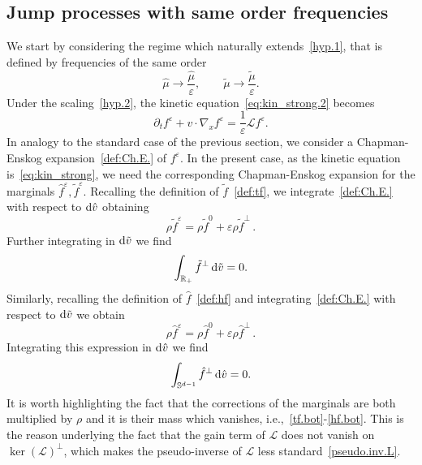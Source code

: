 \documentclass[a4paper]{article}
\theoremstyle{Theorem}\newtheorem{proposition}{Proposition}[section]
\theoremstyle{Remark}\newtheorem{remark}{Remark}[section]
\theoremstyle{Theorem}\newtheorem{theorem}{Theorem}[section]
\newcommand{\R}{\mathbb{R}}
\newcommand{\hv}{\hat{v}}
\newcommand{\tv}{\tilde{v}}
\newcommand{\hf}{\hat{f}}
\newcommand{\tf}{\tilde{f}}
\newcommand{\hmu}{\hat{\mu}}
\newcommand{\tmu}{\tilde{\mu}}
\newcommand{\intS}{\int_{\mathbb{S}^{d-1}}}
\newcommand{\intR}{\int_{\R_+}}
\newcommand{\intV}{\int_{\mathcal{V}}}
\begin{document}
\subsection{Jump processes with same order frequencies}
We start by considering the regime which naturally extends~\eqref{hyp.1}, that is defined by frequencies of the same order 
\begin{equation}\label{hyp.2}
    \hmu \rightarrow \dfrac{\hmu}{\varepsilon}, \qquad \tmu \rightarrow \dfrac{\tmu}{\varepsilon}.
\end{equation}
Under the scaling~\eqref{hyp.2}, the kinetic equation~\eqref{eq:kin_strong.2} becomes
\begin{equation}\label{kin_macro_hyp}
    \partial_t f^\varepsilon +v\cdot \nabla_x f^\varepsilon =\dfrac{1}{\varepsilon} \mathcal{L}f^\varepsilon.
\end{equation}
In analogy to the standard case of the previous section, we consider a Chapman-Enskog expansion~\eqref{def:Ch.E.} of $f^\varepsilon$. In the present case, as the kinetic equation is~\eqref{eq:kin_strong}, we need the corresponding Chapman-Enskog expansion for the marginals $\hf^\varepsilon,\tf^\varepsilon$.
Recalling the definition of $\tf$~\eqref{def:tf}, we integrate~\eqref{def:Ch.E.} with respect to ${\rm d} \hv$ obtaining
\begin{equation*}
    \rho \tf^\varepsilon = \rho \tf^0+\varepsilon \rho \tf^{\bot}\,.
\end{equation*}
Further integrating in ${\rm d} \tv$ we find 
\begin{equation}\label{tf.bot}
\intR \tf^{\bot} \, {\rm d} \tv =0 .
\end{equation}
Similarly, recalling the definition of $\hf$~\eqref{def:hf} and integrating~\eqref{def:Ch.E.} with respect to ${\rm d} \tv$ we obtain
\begin{equation*}
    \rho \hf^\varepsilon = \rho \hf^0+\varepsilon \rho \hf^{\bot}\,. 
\end{equation*}
Integrating this expression in ${\rm d} \hv$ we find
\begin{equation}\label{hf.bot}
\intS \hf^{\bot} \, {\rm d} \hv =0.
\end{equation}
It is worth highlighting the fact that the corrections of the marginals are both multiplied by $\rho$ and it is their mass which vanishes, i.e.,~\eqref{tf.bot}-\eqref{hf.bot}. This is the reason underlying the fact that the gain term of $\mathcal{L}$ does not vanish on $\ker(\mathcal{L})^\bot$, which makes the pseudo-inverse of $\mathcal{L}$ less standard~\eqref{pseudo.inv.L}.
\end{document}
